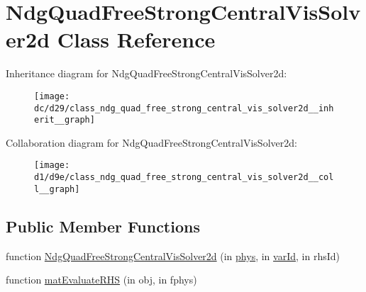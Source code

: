\hypertarget{class_ndg_quad_free_strong_central_vis_solver2d}{}\section{Ndg\+Quad\+Free\+Strong\+Central\+Vis\+Solver2d Class Reference}
\label{class_ndg_quad_free_strong_central_vis_solver2d}


Inheritance diagram for Ndg\+Quad\+Free\+Strong\+Central\+Vis\+Solver2d\+:
\nopagebreak
\begin{figure}[H]
\begin{center}
\leavevmode
\texttt{[image: dc/d29/class\_ndg\_quad\_free\_strong\_central\_vis\_solver2d\_\_inherit\_\_graph]}
\end{center}
\end{figure}


Collaboration diagram for Ndg\+Quad\+Free\+Strong\+Central\+Vis\+Solver2d\+:
\nopagebreak
\begin{figure}[H]
\begin{center}
\leavevmode
\texttt{[image: d1/d9e/class\_ndg\_quad\_free\_strong\_central\_vis\_solver2d\_\_coll\_\_graph]}
\end{center}
\end{figure}
\subsection*{Public Member Functions}
\begin{DoxyCompactItemize}
\item 
function \hyperlink{class_ndg_quad_free_strong_central_vis_solver2d_a1c371c75c299f0a2767c9980ca1e5caf}{Ndg\+Quad\+Free\+Strong\+Central\+Vis\+Solver2d} (in \hyperlink{class_ndg_abstract_vis_solver_a47663b482747f4136520112484ee2fcd}{phys}, in \hyperlink{class_ndg_abstract_vis_solver_ae28ac2785a59d4c1d8b59e578150a50b}{var\+Id}, in rhs\+Id)
\item 
function \hyperlink{class_ndg_quad_free_strong_central_vis_solver2d_a882b1c60db20891f864f3aae3ae9c552}{mat\+Evaluate\+R\+HS} (in obj, in fphys)
\end{DoxyCompactItemize}
